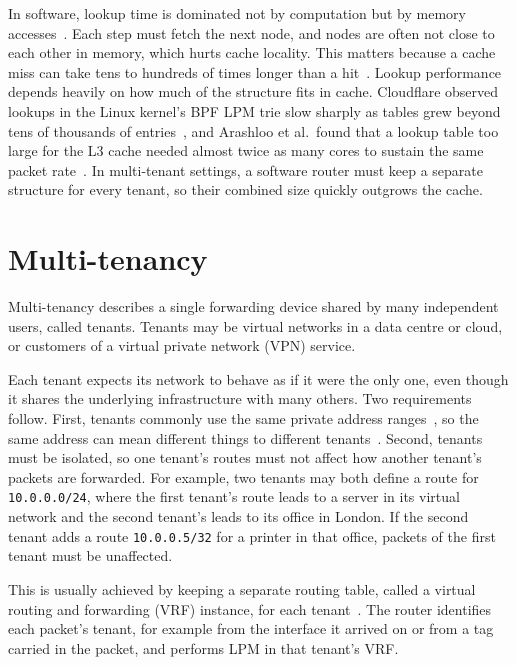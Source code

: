 \documentclass[11pt,a4paper,oneside]{report}
\newcommand{\pfx}[1]{\texttt{#1}}
\begin{document}
In software, lookup time is dominated not by computation but by memory
accesses~\cite{drepper2007}. Each step must fetch the next node, and nodes are
often not close to each other in memory, which hurts cache locality. This
matters because a cache miss can take tens to hundreds of times longer than a
hit~\cite{drepper2007}. Lookup performance depends heavily on how much of the
structure fits in cache. Cloudflare observed lookups in the Linux kernel's BPF
LPM trie slow sharply as tables grew beyond tens of thousands of
entries~\cite{fleming2025}, and Arashloo et al.\ found that a lookup table too
large for the L3 cache needed almost twice as many cores to sustain the same
packet rate~\cite{arashloo2018}. In multi-tenant settings, a software router
must keep a separate structure for every tenant, so their combined size quickly
outgrows the cache.

\section{Multi-tenancy}
\label{sec:multitenancy}

Multi-tenancy describes a single forwarding device shared by many independent
users, called tenants. Tenants may be virtual networks in a data centre or
cloud, or customers of a virtual private network (VPN) service.

Each tenant expects its network to behave as if it were the only one, even
though it shares the underlying infrastructure with many others. Two
requirements follow. First, tenants commonly use the same private address
ranges~\cite{rfc1918}, so the same address can mean different things to
different tenants~\cite{rfc4364}. Second, tenants must be isolated, so one
tenant's routes must not affect how another tenant's packets are forwarded. For
example, two tenants may both define a route for \pfx{10.0.0.0/24}, where the
first tenant's route leads to a server in its virtual network and the second
tenant's leads to its office in London. If the second tenant adds a route
\pfx{10.0.0.5/32} for a printer in that office, packets of the first tenant
must be unaffected.

This is usually achieved by keeping a separate routing table, called a
virtual routing and forwarding (VRF) instance, for each
tenant~\cite{rfc4364}. The router identifies each packet's tenant, for example
from the interface it arrived on or from a tag carried in the packet, and
performs LPM in that tenant's VRF.
\end{document}

